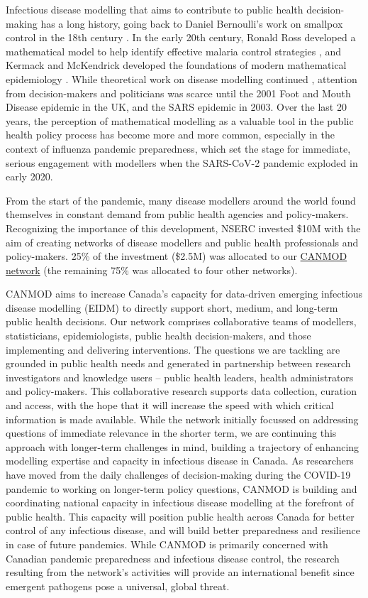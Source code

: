 
Infectious disease modelling that aims to contribute to public health
decision-making has a long history, going back to Daniel Bernoulli’s
work on smallpox control in the 18th century \cite{Bern1760}.  In the
early 20th century, Ronald Ross developed a mathematical model to help
identify effective malaria control strategies \cite{Ross11}, and
Kermack and McKendrick developed the foundations of modern
mathematical epidemiology \cite{KermMcKe27}.  While theoretical work
on disease modelling continued \cite{Bart57,Bail75,AndeMay91},
attention from decision-makers and politicians was scarce until the
2001 Foot and Mouth Disease epidemic in the UK, and the SARS epidemic
in 2003.  Over the last 20 years, the perception of mathematical
modelling as a valuable tool in the public health policy process has
become more and more common, especially in the context of influenza
pandemic preparedness, which set the stage for immediate, serious
engagement with modellers when the SARS-CoV-2 pandemic exploded in
early 2020.

From the start of the pandemic, many disease modellers around the
world found themselves in constant demand from public health agencies
and policy-makers.  Recognizing the importance of this development,
NSERC invested \$10M with the aim of creating networks of disease
modellers and public health professionals and policy-makers.  25\% of
the investment (\$2.5M) was allocated to our
\href{https://canmod.net/}{CANMOD network} (the remaining 75\% was
allocated to four other networks).

CANMOD aims to increase Canada’s capacity for data-driven emerging
infectious disease modelling (EIDM) to directly support short, medium,
and long-term public health decisions. Our network comprises
collaborative teams of modellers, statisticians, epidemiologists,
public health decision-makers, and those implementing and delivering
interventions. The questions we are tackling are grounded in public
health needs and generated in partnership between research
investigators and knowledge users -- public health leaders, health
administrators and policy-makers. This collaborative research supports
data collection, curation and access, with the hope that it will
increase the speed with which critical information is made available.
While the network initially focussed on addressing questions of
immediate relevance in the shorter term, we are continuing this
approach with longer-term challenges in mind, building a trajectory of
enhancing modelling expertise and capacity in infectious disease in
Canada. As researchers have moved from the daily challenges of
decision-making during the COVID-19 pandemic to working on longer-term
policy questions, CANMOD is building and coordinating national
capacity in infectious disease modelling at the forefront of public
health. This capacity will position public health across Canada for
better control of any infectious disease, and will build better
preparedness and resilience in case of future pandemics. While CANMOD
is primarily concerned with Canadian pandemic preparedness and
infectious disease control, the research resulting from the network’s
activities will provide an international benefit since emergent
pathogens pose a universal, global threat.

